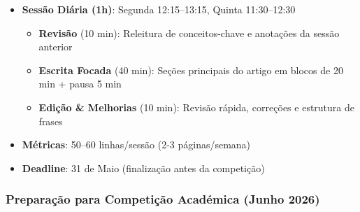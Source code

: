 \documentclass[a4paper,11pt]{article}
\begin{document}
\begin{tcolorbox}[enhanced, frame hidden, rounded corners, colback=colmain!8, colframe=colmain!60, boxrule=2pt, left=8pt, right=8pt, top=6pt, bottom=6pt, boxsep=4pt, arc=8pt, outer arc=8pt]
\begin{itemize}[before=\setlength\parindent{0pt}, label=\color{colmain}{\(\bullet\)}, itemsep=6pt, topsep=4pt]
  \item \textbf{Sessão Diária (1h)}: Segunda 12:15--13:15, Quinta 11:30--12:30
  \begin{itemize}[label=\textcolor{colmain}{–}, itemsep=4pt]
    \item \textbf{Revisão} (10 min): Releitura de conceitos-chave e anotações da sessão anterior
    \item \textbf{Escrita Focada} (40 min): Seções principais do artigo em blocos de 20 min + pausa 5 min
    \item \textbf{Edição \& Melhorias} (10 min): Revisão rápida, correções e estrutura de frases
  \end{itemize}
  \item \textbf{Métricas}: 50--60 linhas/sessão (2-3 páginas/semana)
  \item \textbf{Deadline}: 31 de Maio (finalização antes da competição)
\end{itemize}
\end{tcolorbox}

\vspace{10pt}

\subsubsection*{\Large\textbf{Preparação para Competição Académica (Junho 2026)}}

\vspace{6pt}
\end{document}
